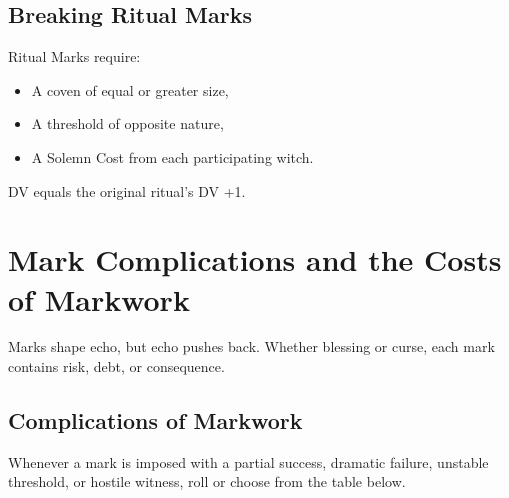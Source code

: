 \documentclass[11pt]{book}
\begin{document}
\subsection*{Breaking Ritual Marks}

Ritual Marks require:
\begin{itemize}[noitemsep]
    \item A coven of equal or greater size,
    \item A threshold of opposite nature,
    \item A Solemn Cost from each participating witch.
\end{itemize}

DV equals the original ritual's DV +1.

\section*{Mark Complications and the Costs of Markwork}

Marks shape echo, but echo pushes back.  
Whether blessing or curse, each mark contains risk, debt, or consequence.

\subsection*{Complications of Markwork}

Whenever a mark is imposed with a partial success, dramatic failure,
unstable threshold, or hostile witness, roll or choose from the table below.
\end{document}
